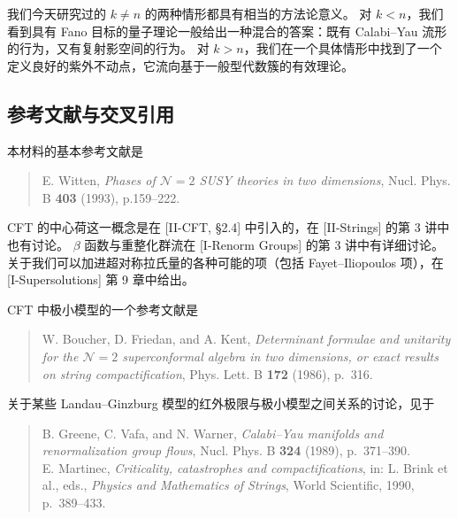 
我们今天研究过的 $k\ne n$ 的两种情形都具有相当的方法论意义。
对 $k<n$，我们看到具有 Fano 目标的量子理论一般给出一种混合的答案：既有 Calabi--Yau 流形的行为，又有复射影空间的行为。
对 $k>n$，我们在一个具体情形中找到了一个定义良好的紫外不动点，它流向基于一般型代数簇的有效理论。

\subsection{参考文献与交叉引用}

本材料的基本参考文献是
\begin{quote}
E. Witten, \emph{Phases of $\mathcal{N}=2$ SUSY theories in two dimensions}, Nucl. Phys. B \textbf{403} (1993), p.159--222.
\end{quote}


CFT 的中心荷这一概念是在 [II-CFT, §2.4] 中引入的，在 [II-Strings] 的第 3 讲中也有讨论。
$\beta$ 函数与重整化群流在 [I-Renorm Groups] 的第 3 讲中有详细讨论。
关于我们可以加进超对称拉氏量的各种可能的项（包括 Fayet--Iliopoulos 项），在 [I-Supersolutions] 第 9 章中给出。


CFT 中极小模型的一个参考文献是
\begin{quote}
W. Boucher, D. Friedan, and A. Kent, \emph{Determinant formulae and unitarity for the $\mathcal{N}=2$ superconformal algebra in two dimensions, or exact results on string compactification}, Phys. Lett. B \textbf{172} (1986), p.~316.
\end{quote}

关于某些 Landau--Ginzburg 模型的红外极限与极小模型之间关系的讨论，见于
\begin{quote}
B. Greene, C. Vafa, and N. Warner, \emph{Calabi--Yau manifolds and renormalization group flows}, Nucl. Phys. B \textbf{324} (1989), p.~371--390.\\
E. Martinec, \emph{Criticality, catastrophes and compactifications}, in: L. Brink et al., eds., \emph{Physics and Mathematics of Strings}, World Scientific, 1990, p.~389--433.
\end{quote}

